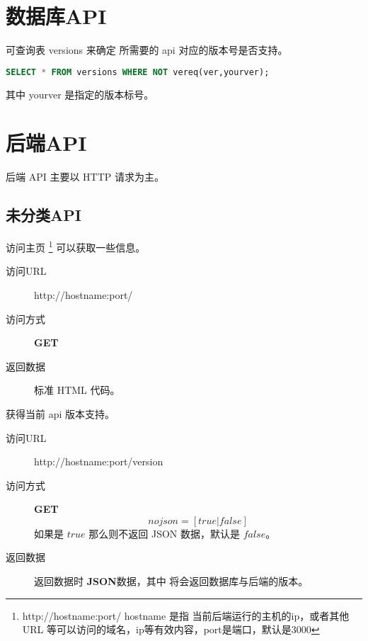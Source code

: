 \documentclass[UTF8]{article}
\def\GET{\colorbox[rgb]{0.77,0.53,0.97}{\textbf{GET}}}
\def\bfJSON{\textbf{JSON}}
\def\viaurl{\item[{\quad\colorbox[rgb]{0.47,0.88,0.89}{访问URL}}]}
\def\viareq#1{\item[{\quad\colorbox[rgb]{0.57,0.88,0.99}{访问方式}}] #1}
\def\rtdata{\item[{\quad\colorbox[rgb]{0.70,0.9,0.59}{返回数据}}]}
\begin{document}
    \section{数据库API}
    可查询表 versions 来确定 所需要的 api 对应的版本号是否支持。
    \begin{lstlisting}[language=SQL]
SELECT * FROM versions WHERE NOT vereq(ver,yourver);
    \end{lstlisting}
    其中 yourver 是指定的版本标号。




















    \section{后端API}
    后端 API 主要以 HTTP 请求为主。


    \subsection{未分类API}

    访问主页
    \footnote{ http://hostname:port/ hostname 是指 当前后端运行的主机的ip，或者其他URL 等可以访问的域名，ip等有效内容，port是端口，默认是3000}
    可以获取一些信息。
    \begin{description}
        \viaurl http://hostname:port/
        \viareq{\GET}
        \rtdata 标准 HTML 代码。
    \end{description}

    获得当前 api 版本支持。
    \begin{description}
		\viaurl http://hostname:port/version
		\viareq{\GET}
		$$nojson=[true|false]$$
		如果是 $true$ 那么则不返回 JSON 数据，默认是 $false$。
        \rtdata 返回数据时 \bfJSON 数据，其中 将会返回数据库与后端的版本。
	\end{description}

\end{document}
